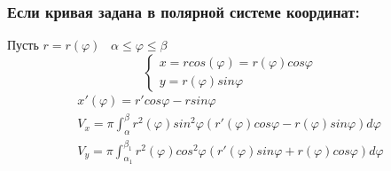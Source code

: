 \documentclass[12pt]{article}
\begin{document}
    \subsubsection*{Если кривая задана в полярной системе координат:}\noindent
    Пусть $r=r(\varphi) \;\;\; \alpha \leq \varphi \leq \beta$
    \[ \begin{cases}
        x=rcos(\varphi)=r(\varphi)cos\varphi\\
        y=r(\varphi)sin\varphi
    \end{cases} \]
    \begin{gather*}
        x'(\varphi)=r'cos\varphi-rsin\varphi\\
        \boxed{V_x=\pi \int_{\alpha}^{\beta} r^2(\varphi)sin^2\varphi (r'(\varphi)cos \varphi -r(\varphi)sin\varphi)d\varphi}\\
        \boxed{V_y=\pi \int_{\alpha_1}^{\beta_1}r^2(\varphi)cos^2\varphi(r'(\varphi)sin\varphi + r(\varphi)cos\varphi)d\varphi}
    \end{gather*}
\end{document}
